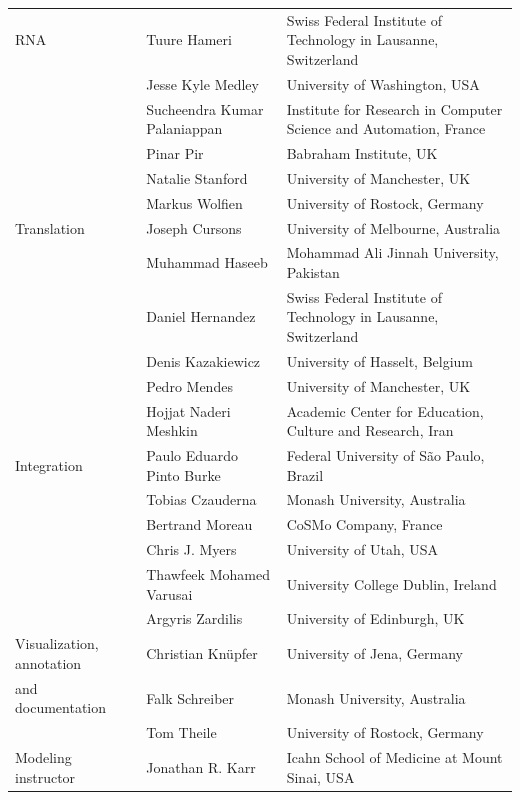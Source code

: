 \documentclass[journal,transmag]{IEEEtran}
\begin{document}
\begin{table}[ht!]
\begin{tabularx}{\textwidth}{l||l||X}
RNA                       & Tuure Hameri                     & Swiss Federal Institute of Technology in Lausanne, Switzerland\\
                          & Jesse Kyle Medley                & University of Washington, USA\\
                          & Sucheendra Kumar Palaniappan     & Institute for Research in Computer Science and Automation, France\\
                          & Pinar Pir                        & Babraham Institute, UK\\
                          & Natalie Stanford                 & University of Manchester, UK\\
                          & Markus Wolfien                   & University of Rostock, Germany\\\hline
Translation               & Joseph Cursons                   & University of Melbourne, Australia\\
                          & Muhammad Haseeb                  & Mohammad Ali Jinnah University, Pakistan\\
                          & Daniel Hernandez                 & Swiss Federal Institute of Technology in Lausanne, Switzerland\\
                          & Denis Kazakiewicz                & University of Hasselt, Belgium\\
                          & Pedro Mendes                     & University of Manchester, UK\\
                          & Hojjat Naderi Meshkin            & Academic Center for Education, Culture and Research, Iran\\\hline
Integration               & Paulo Eduardo Pinto Burke        & Federal University of S\~ao Paulo, Brazil\\
                          & Tobias Czauderna                 & Monash University, Australia\\
                          & Bertrand Moreau                  & CoSMo Company, France\\
                          & Chris J. Myers                   & University of Utah, USA\\
		                  & Thawfeek Mohamed Varusai         & University College Dublin, Ireland\\
		                  & Argyris Zardilis                 & University of Edinburgh, UK\\\hline
Visualization, annotation & Christian Kn\"upfer              & University of Jena, Germany\\
and documentation         & Falk Schreiber                   & Monash University, Australia\\
                          & Tom Theile                       & University of Rostock, Germany\\\hline
Modeling instructor       & Jonathan R. Karr                 & Icahn School of Medicine at Mount Sinai, USA\\\hline
\end{tabularx}
\end{table}
\end{document}

